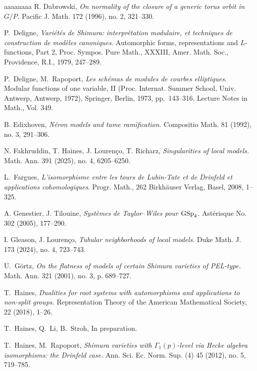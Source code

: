 \documentclass[reqno, 10pt]{amsart}
\theoremstyle{definition}
\numberwithin{equation}{subsection}
\numberwithin{subsubsection}{subsection}
\begin{document}
\begin{thebibliography}{aaaaaaaa}
 R. Dabrowski, \emph{On normality of the closure of a generic torus orbit in $G/P$.}
Pacific J. Math. 172 (1996), no. 2, 321--330.


P.~Deligne, \emph{Vari\'et\'es de {S}himura: interpr\'etation modulaire, et
  techniques de construction de mod\`eles canoniques}. Automorphic forms,
  representations and {$L$}-functions, {P}art 2, Proc. Sympos.
  Pure Math., XXXIII, Amer. Math. Soc., Providence, R.I., 1979, 247--289.
 
  
 
 

P.~Deligne, M.~Rapoport, \emph{Les sch\'emas de modules de courbes
  elliptiques}. Modular functions of one variable, {II} ({P}roc. {I}nternat.
  {S}ummer {S}chool, {U}niv. {A}ntwerp, {A}ntwerp, 1972), Springer, Berlin,
  1973, pp.~143--316. Lecture Notes in Math., Vol. 349.  
  
 

  B. Edixhoven, \textit{ N\'eron models and tame ramification.} Compositio Math. 81 (1992), no. 3, 291--306.

 N. Fakhruddin,  T. Haines,  J. Louren\c co,   T. Richarz,  
\emph{Singularities of local models.}
Math. Ann. 391 (2025), no. 4, 6205--6250.

  L.~Fargues, \emph{ L'isomorphisme entre les tours de Lubin-Tate et de Drinfeld et applications cohomologiques}.
Progr. Math., 262
Birkh\"auser Verlag, Basel, 2008, 1--325.
  
  A. Genestier, J. Tilouine, \emph{Syst\`emes de Taylor--Wiles pour  ${\rm GSp}_4$.} 
Ast\'erisque No. 302 (2005), 177--290.


  I. Gleason, J. Louren\c co, \emph{Tubular neighborhoods of local models.}
Duke Math. J. 173 (2024), no. 4, 723--743.
 

 U.~G\"ortz, \emph{On the flatness of models of certain Shimura varieties of PEL-type.} Math. Ann. 321 (2001), no. 3, p. 689--727.  



 T.~Haines, \emph{Dualities for root systems with automorphisms and applications to non-split groups.} Representation
Theory of the American Mathematical Society, 22 (2018), 1--26. 

  T.~Haines, Q.~Li, B.~Stroh, In preparation.
 
  T.~Haines, M.~Rapoport, \textit{Shimura varieties with $\Gamma_1(p)$-level via Hecke algebra isomorphisms: the Drinfeld case.}
Ann. Sci. Ec. Norm. Sup. (4) 45 (2012), no. 5, 719--785.


\end{thebibliography}
\end{document}
